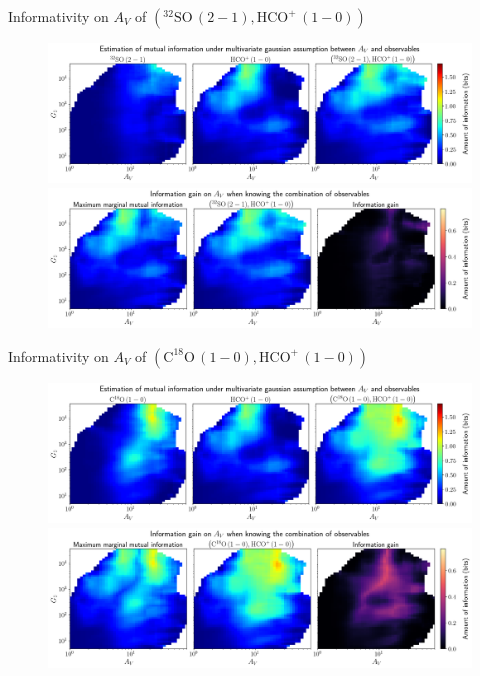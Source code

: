 \documentclass{beamer}
\begin{document}
\begin{frame}{Informativity on $A_V$ of $\left(\mathrm{^{32}SO\,(2-1)},\mathrm{HCO^+\,(1-0)}\right)$}
    \begin{figure}
        \centering
        \includegraphics[width=0.95\linewidth]{../linearinfo/av__32so21_hcop10_linearinfo.png}
        \vfill
        \includegraphics[width=0.95\linewidth]{../linearinfo/av__32so21_hcop10_linearinfo_gain.png}
    \end{figure}
\end{frame}

\begin{frame}{Informativity on $A_V$ of $\left(\mathrm{C^{18}O\,(1-0)},\mathrm{HCO^+\,(1-0)}\right)$}
    \begin{figure}
        \centering
        \includegraphics[width=0.95\linewidth]{../linearinfo/av__c18o10_hcop10_linearinfo.png}
        \vfill
        \includegraphics[width=0.95\linewidth]{../linearinfo/av__c18o10_hcop10_linearinfo_gain.png}
    \end{figure}
\end{frame}
\end{document}
